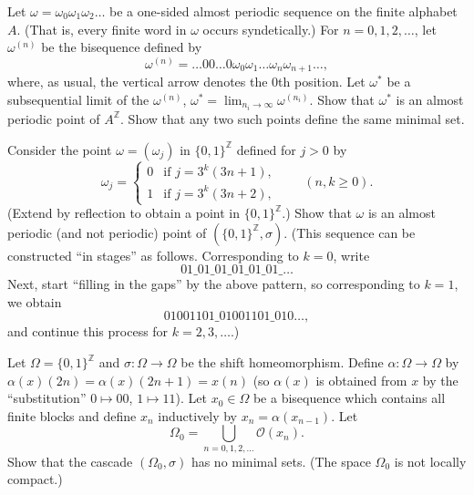 \begin{exercise*}[8]
    Let $\omega = \omega_0 \omega_1 \omega_2 \ldots$ be a one-sided almost periodic sequence on the finite alphabet $A$. (That is, every finite word in $\omega$ occurs syndetically.) For $n = 0, 1, 2, \ldots$, let $\omega^{(n)}$ be the bisequence defined by
    \[
        \omega^{(n)} = \ldots 0 0 \ldots 0 \omega_0 \omega_1 \ldots \omega_n \omega_{n+1} \ldots,
    \]
    where, as usual, the vertical arrow denotes the $0$th position. Let $\omega^*$ be a subsequential limit of the $\omega^{(n)}$, $\omega^* = \lim_{n_i \to \infty} \omega^{(n_i)}$. Show that $\omega^*$ is an almost periodic point of $A^{\mathbb{Z}}$. Show that any two such points define the same minimal set.
\end{exercise*}


\begin{exercise*}[9]
    Consider the point $\omega = (\omega_j)$ in $\{0,1\}^{\mathbb{Z}}$ defined for $j > 0$ by
    \[
        \omega_j =
        \begin{cases}
            0 & \text{if } j = 3^k(3n + 1), \\
            1 & \text{if } j = 3^k(3n + 2),
        \end{cases}
        \qquad (n, k \ge 0).
    \]
    (Extend by reflection to obtain a point in $\{0,1\}^{\mathbb{Z}}$.) Show that $\omega$ is an almost periodic (and not periodic) point of $(\{0,1\}^{\mathbb{Z}}, \sigma)$. (This sequence can be constructed “in stages” as follows. Corresponding to $k = 0$, write
    \[
        01\_01\_01\_01\_01\_01\_ \ldots
    \]
    Next, start “filling in the gaps” by the above pattern, so corresponding to $k = 1$, we obtain
    \[
        01001101\_01001101\_010\ldots,
    \]
    and continue this process for $k = 2, 3, \ldots$.)
\end{exercise*}

\begin{exercise*}[10]
    Let $\Omega = \{0,1\}^{\mathbb{Z}}$ and $\sigma : \Omega \to \Omega$ be the shift homeomorphism. Define $\alpha : \Omega \to \Omega$ by $\alpha(x)(2n) = \alpha(x)(2n+1) = x(n)$ (so $\alpha(x)$ is obtained from $x$ by the “substitution” $0 \mapsto 00$, $1 \mapsto 11$). Let $x_0 \in \Omega$ be a bisequence which contains all finite blocks and define $x_n$ inductively by $x_n = \alpha(x_{n-1})$. Let
    \[
        \Omega_0 = \bigcup_{n=0,1,2,\ldots} \mathcal{O}(x_n).
    \]
    Show that the cascade $(\Omega_0, \sigma)$ has no minimal sets. (The space $\Omega_0$ is not locally compact.)
\end{exercise*}

